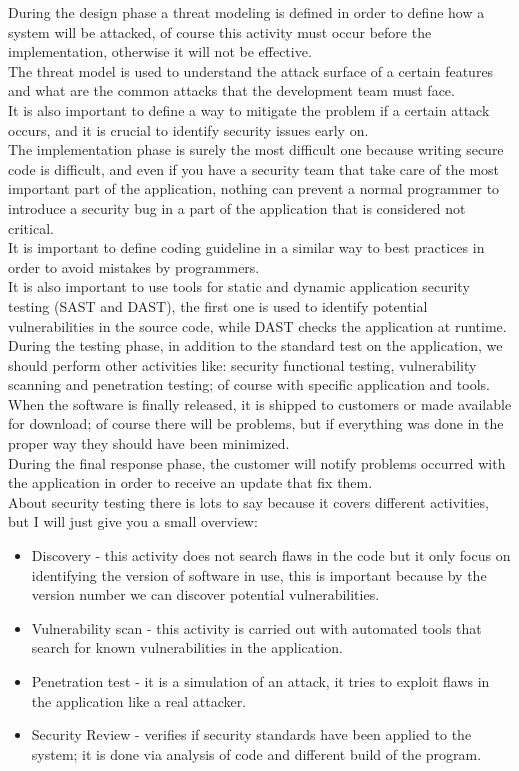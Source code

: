 During the design phase a threat modeling is defined in order to define how a system will be attacked, of course this
activity must occur before the implementation, otherwise it will not be effective.\\
The threat model is used to understand the attack surface of a certain features and what are the common attacks that
the development team must face.\\
It is also important to define a way to mitigate the problem if a certain attack occurs, and it is crucial to identify
security issues early on.\\

The implementation phase is surely the most difficult one because writing secure code is difficult, and even if you have
a security team that take care of the most important part of the application, nothing can prevent a normal programmer to introduce a security bug in a part of the application that is considered not critical.\\
It is important to define coding guideline in a similar way to best practices in order to avoid mistakes by programmers.\\
It is also important to use tools for static and dynamic application security testing (SAST and DAST), the first one is used to
identify potential vulnerabilities in the source code, while DAST checks the application at runtime.\\

During the testing phase, in addition to the standard test on the application, we should perform other activities like:
security functional testing, vulnerability scanning and penetration testing; of course with specific application and tools.\\ 

When the software is finally released, it is shipped to customers or made available for download; of course there will be
problems, but if everything was done in the proper way they should have been minimized.\\
During the final response phase, the customer will notify problems occurred with the application in order to receive
an update that fix them.\\

About security testing there is lots to say because it covers different activities, but I will just give you a small overview:
\begin{itemize}
	\item Discovery - this activity does not search flaws in the code but it only focus on identifying the version of software in use, this is important because by the version number we can discover potential vulnerabilities.
	\item Vulnerability scan - this activity is carried out with automated tools that search for
	known vulnerabilities in the application.
	\item Penetration test - it is a simulation of an attack, it tries to exploit flaws in the application like a real attacker.
	\item Security Review - verifies if security standards have been applied to the system; it is
	done via analysis of code and different build of the program.
\end{itemize}


